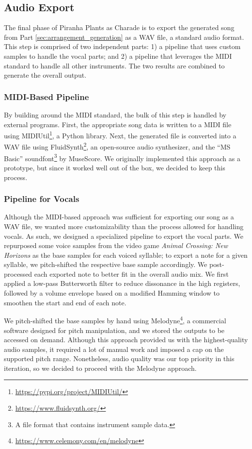 \subsection{Audio Export}
\label{sec:audio_export}

The final phase of Piranha Plants as Charade is to export the generated song from Part \ref{sec:arrangement_generation} as a WAV file, a standard audio format. This step is comprised of two independent parts: 1) a pipeline that uses custom samples to handle the vocal parts; and 2) a pipeline that leverages the MIDI standard to handle all other instruments. The two results are combined to generate the overall output.

\subsubsection{MIDI-Based Pipeline}

By building around the MIDI standard, the bulk of this step is handled by external programs. First, the appropriate song data is written to a MIDI file using MIDIUtil\footnote{\url{https://pypi.org/project/MIDIUtil/}}, a Python library. Next, the generated file is converted into a WAV file using FluidSynth\footnote{\url{https://www.fluidsynth.org/}}, an open-source audio synthesizer, and the ``MS Basic'' soundfont\footnote{A file format that contains instrument sample data.} by MuseScore. We originally implemented this approach as a prototype, but since it worked well out of the box, we decided to keep this process.

\subsubsection{Pipeline for Vocals}

Although the MIDI-based approach was sufficient for exporting our song as a WAV file, we wanted more customizability than the process allowed for handling vocals. As such, we designed a specialized pipeline to export the vocal parts. We repurposed some voice samples from the video game \emph{Animal Crossing: New Horizons} as the base samples for each voiced syllable; to export a note for a given syllable, we pitch-shifted the respective base sample accordingly. We post-processed each exported note to better fit in the overall audio mix. We first applied a low-pass Butterworth filter to reduce dissonance in the high registers, followed by a volume envelope based on a modified Hamming window to smoothen the start and end of each note.

We pitch-shifted the base samples by hand using Melodyne\footnote{\url{https://www.celemony.com/en/melodyne}}, a commercial software designed for pitch manipulation, and we stored the outputs to be accessed on demand. Although this approach provided us with the highest-quality audio samples, it required a lot of manual work and imposed a cap on the supported pitch range. Nonetheless, audio quality was our top priority in this iteration, so we decided to proceed with the Melodyne approach.
